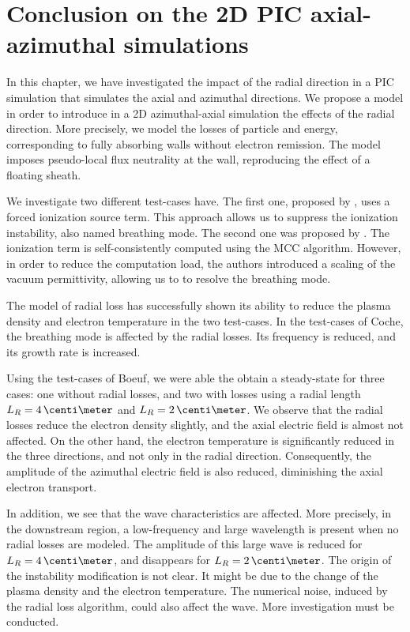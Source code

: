 
\section{Conclusion on the 2D PIC axial-azimuthal simulations}

In this chapter, we have investigated the impact of the radial direction in a \ac{PIC} simulation that simulates the axial and azimuthal directions.
We propose a model in order to introduce in a \ac{2D} azimuthal-axial simulation the effects of the radial direction.
More precisely, we model the losses of particle and energy, corresponding to fully absorbing walls without electron remission.
The model imposes pseudo-local flux neutrality at the wall, reproducing the effect of a floating sheath.

We investigate two different test-cases have. The first one, proposed by \citet{boeuf2018}, uses a forced ionization source term.
This approach allows us to suppress the ionization instability, also named breathing mode.
The second one was proposed by \citet{coche2014}. 
The ionization term is self-consistently computed using the \ac{MCC} algorithm.
However, in order to reduce the computation load, the authors introduced a scaling of the vacuum permittivity, allowing us to to resolve the breathing mode.

\vspace{1em}
The model of radial loss has successfully shown its ability to reduce the plasma density and electron temperature in the two test-cases.
In the test-cases of Coche, the breathing mode is affected by the radial losses. 
Its frequency is reduced, and its growth rate is increased.

Using the test-cases of Boeuf, we were able the obtain a steady-state for three cases\string: one without radial losses, and two with losses using a radial length $L_R=4\,\centi\meter$ and $L_R=2\,\centi\meter$.
We observe that the radial losses reduce the electron density slightly, and the axial electric field is almost not affected.
On the other hand, the electron temperature is significantly reduced in the three directions, and not only in the radial direction.
Consequently, the amplitude of the azimuthal electric field is also reduced, diminishing the axial electron transport.

In addition, we see that the wave characteristics are affected.
More precisely, in the downstream region, a low-frequency and large wavelength is present when no radial losses are modeled.
The amplitude of this large wave is reduced for $L_R=4\,\centi\meter$, and disappears for $L_R=2\,\centi\meter$.
The origin of the instability modification is not clear.
It might be due to the change of the plasma density and the electron temperature.
The numerical noise, induced by the radial loss algorithm, could also affect the wave.
More investigation must be conducted.

